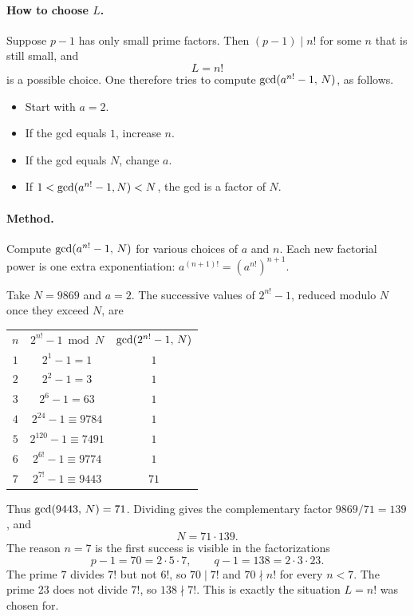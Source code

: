 \paragraph{How to choose $L$.}
Suppose $p-1$ has only small prime factors. Then $(p-1)\mid n!$ for some $n$ that is still small, and
\[
    L=n!
\]
is a possible choice. One therefore tries to compute $\operatorname{gcd}(a^{n!}-1,\, N)$, as follows.
\begin{itemize}[leftmargin=1.4em]
    \item Start with $a=2$.
    \item If the gcd equals $1$, increase $n$.
    \item If the gcd equals $N$, change $a$.
    \item If $1<\operatorname{gcd}(a^{n!}-1,N)<N$, the gcd is a factor of $N$.
\end{itemize}


\paragraph{Method.}
Compute $\operatorname{gcd}(a^{n!}-1,\, N)$ for various choices of $a$ and $n$. Each new factorial power is one extra exponentiation: $a^{(n+1)!}=(a^{n!})^{n+1}$.

\begin{example}
Take $N=9869$ and $a=2$. The successive values of $2^{n!}-1$, reduced modulo $N$ once they exceed $N$, are
\begin{center}
\begin{tabular}{c@{\qquad}c@{\qquad}c}
    $n$ & $2^{n!}-1 \bmod N$ & $\operatorname{gcd}(2^{n!}-1,\, N)$\\[0.3em]
    $1$ & $2^{1}-1=1$ & $1$\\
    $2$ & $2^{2}-1=3$ & $1$\\
    $3$ & $2^{6}-1=63$ & $1$\\
    $4$ & $2^{24}-1\equiv 9784$ & $1$\\
    $5$ & $2^{120}-1\equiv 7491$ & $1$\\
    $6$ & $2^{6!}-1\equiv 9774$ & $1$\\
    $7$ & $2^{7!}-1\equiv 9443$ & $71$
\end{tabular}
\end{center}
Thus $\operatorname{gcd}(9443,\, N)=71$. Dividing gives the complementary factor $9869/71=139$, and
\[
    N=71\cdot 139.
\]
The reason $n=7$ is the first success is visible in the factorizations
\[
    p-1=70=2\cdot 5\cdot 7, \qquad q-1=138=2\cdot 3\cdot 23.
\]
The prime $7$ divides $7!$ but not $6!$, so $70\mid 7!$ and $70\nmid n!$ for every $n<7$. The prime $23$ does not divide $7!$, so $138\nmid 7!$. This is exactly the situation $L=n!$ was chosen for.
\end{example}

